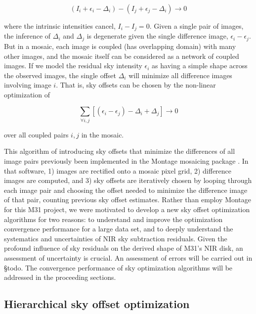 \documentclass[iop]{emulateapj}
\newcommand{\todo}[1]{\textcolor{RedOrange}{#1}} %
\begin{document}
\begin{equation}
    (I_i + \epsilon_i - \Delta_i) - (I_j + \epsilon_j - \Delta_i) \rightarrow 0
\end{equation}

\noindent where the intrinsic intensities cancel, $I_i - I_j = 0$. Given a single pair of images, the inference of $\Delta_i$ and $\Delta_j$ is degenerate given the single difference image, $\epsilon_i-\epsilon_j$. But in a mosaic, each image is coupled (has overlapping domain) with many other images, and the mosaic itself can be considered as a network of coupled images. If we model the residual sky intensity $\epsilon_i$ as having a simple shape across the observed images, the single offset $\Delta_i$ will minimize all difference images involving image $i$. That is, sky offsets can be chosen by the non-linear optimization of

\begin{equation}
    \sum_{\forall i,j} [(\epsilon_i - \epsilon_j) - \Delta_i + \Delta_j] \rightarrow 0
    \label{eq:scalartheoryobj}
\end{equation}

\noindent over all coupled pairs $i,j$ in the mosaic.

This algorithm of introducing sky offsets that minimize the differences of all image pairs previously been implemented in the Montage mosaicing package \citep{Berriman:2008}. In that software, 1) images are rectified onto a mosaic pixel grid, 2) difference images are computed, and 3) sky offsets are iteratively chosen by looping through each image pair and choosing the offset needed to minimize the difference image of that pair, counting previous sky offset estimates. Rather than employ Montage for this M31 project, we were motivated to develop a new sky offset optimization algorithms for two reasons: to understand and improve the optimization convergence performance for a large data set, and to deeply understand the systematics and uncertainties of NIR sky subtraction residuals. Given the profound influence of sky residuals on the derived shape of M31's NIR disk, an assessment of uncertainty is crucial. An assessment of errors will be carried out in \todo{\S todo}. The convergence performance of sky optimization algorithms will be addressed in the proceeding sections.

\subsection{Hierarchical sky offset optimization}
\end{document}

